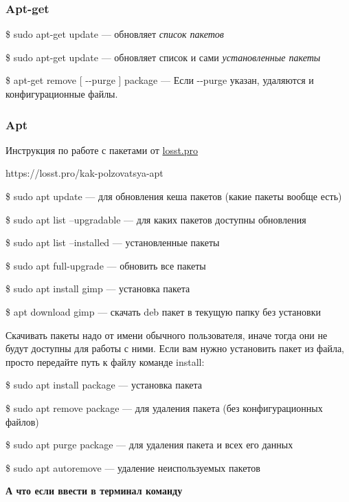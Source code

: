 \documentclass[oneside, final, 14pt]{extreport} %
\begin{document}
\subsubsection*{Apt-get}

\$ sudo apt-get update --- обновляет \textit{список пакетов}

\$ sudo apt-get update --- обновляет список и сами \textit{установленные пакеты}

\$ apt-get remove [ \--\--purge ] package --- Если \--\--purge указан, удаляются и конфигурационные файлы.

\subsubsection{Apt}

Инструкция по работе с пакетами от \href{https://losst.pro/kak-polzovatsya-apt}{losst.pro}

https://losst.pro/kak-polzovatsya-apt 

\vspace*{\baselineskip}

\$ sudo apt update --- для обновления кеша пакетов (какие пакеты вообще есть)

\$ sudo apt list --upgradable --- для каких пакетов доступны обновления

\$ sudo apt list --installed --- установленные пакеты

\$ sudo apt full-upgrade --- обновить все пакеты

\$ sudo apt install gimp --- установка пакета

\$ apt download gimp --- скачать deb пакет в текущую папку без установки

Скачивать пакеты надо от имени обычного пользователя, иначе тогда они не будут доступны для работы с ними. Если вам нужно установить пакет из файла, просто передайте путь к файлу команде install:

\$ sudo apt install package --- установка пакета

\$ sudo apt remove package --- для удаления пакета (без конфигурационных файлов)

\$ sudo apt purge package --- для удаления пакета и всех его данных

\$ sudo apt autoremove --- удаление неиспользуемых пакетов

\vspace*{\baselineskip}

\textbf{А что если ввести в терминал команду}
\end{document}
